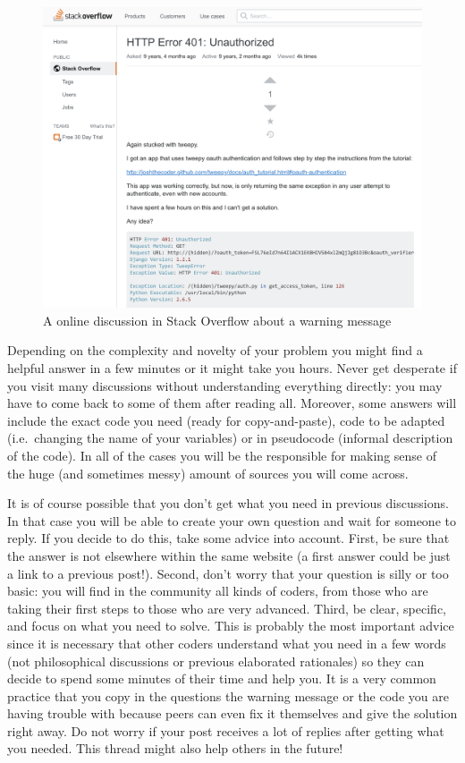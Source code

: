 \begin{figure}
\centering
\includegraphics[width=0.9\linewidth]{figures/ch4_stackover.png}
\caption{A online discussion in Stack Overflow about a warning message }
\label{fig:stackover}
\end{figure}

Depending on the complexity and novelty of your problem you might  find a helpful answer in a few minutes or it might take you hours. Never get desperate if you visit many discussions without understanding everything directly: you may have to come back to some of them after reading all. Moreover, some answers will include the exact code you need (ready for copy-and-paste), code to be adapted (i.e.\ changing the name of your variables) or in pseudocode (informal description of the code). In all of the cases you will be the responsible for making sense of the huge (and sometimes messy) amount of sources you will come across.

It is of course possible that you don't get what you need in previous discussions. In that case you will be able to create your own question and wait for someone to reply. If you decide to do this, take some advice into account. First, be sure that the answer is not elsewhere within the same website (a first answer could be just a link to a previous post!). Second, don't worry that your question is silly or too basic: you will find in the community all kinds of coders, from those who are taking their first steps to those who are very advanced. Third, be clear, specific, and focus on what you need to solve. This is probably the most important advice since it is necessary that other coders understand what you need in a few words (not philosophical discussions or previous elaborated rationales)  so they can decide to spend some minutes of their time and help you. It is a very common practice that you copy in the questions the warning message or the code you are having trouble with because peers can even fix it themselves and give the solution right away. Do not worry if your post receives a lot of replies after getting what you needed. This thread might also help others in the future!


